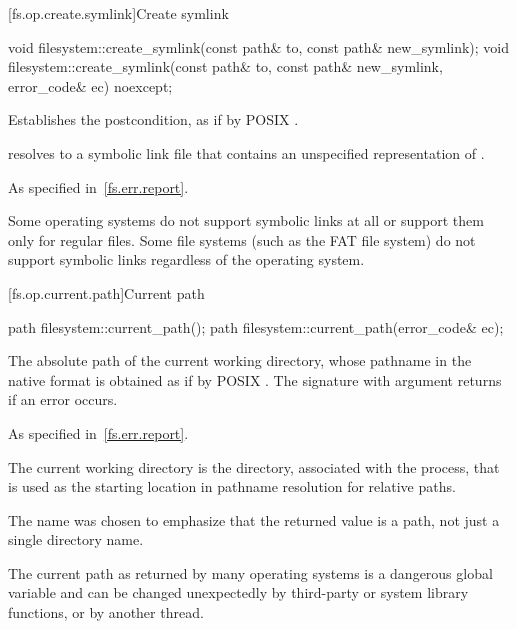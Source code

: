 [fs.op.create.symlink]{Create symlink}

%
\begin{itemdecl}
void filesystem::create_symlink(const path& to, const path& new_symlink);
void filesystem::create_symlink(const path& to, const path& new_symlink,
                    error_code& ec) noexcept;
\end{itemdecl}

\begin{itemdescr}
\pnum
\effects
Establishes the postcondition, as if by POSIX .

\pnum
\ensures
{} resolves to a symbolic link file that
  contains an unspecified representation of .

\pnum
\throws
As specified in~\ref{fs.err.report}.

\pnum
\begin{note}
Some operating systems do not support symbolic links at all or support
  them only for regular files.
  Some file systems (such as the FAT file system) do not
  support symbolic links regardless of the operating system.
\end{note}
\end{itemdescr}

[fs.op.current.path]{Current path}

%
\begin{itemdecl}
path filesystem::current_path();
path filesystem::current_path(error_code& ec);
\end{itemdecl}

\begin{itemdescr}
\pnum
\returns
The absolute path of the current working directory,
  whose pathname in the native format is
  obtained as if by POSIX .
  The signature with argument  returns  if an
  error occurs.

\pnum
\throws
As specified in~\ref{fs.err.report}.

\pnum
\remarks
The current working directory is the directory, associated
  with the process, that is used as the starting location in pathname resolution
  for relative paths.

\pnum
\begin{note}
The  name was chosen to emphasize that the returned value is a
  path, not just a single directory name.
\end{note}

\pnum
\begin{note}
The current path as returned by many operating systems is a dangerous
  global variable and can be changed unexpectedly by third-party or system
  library functions, or by another thread.
\end{note}
\end{itemdescr}

